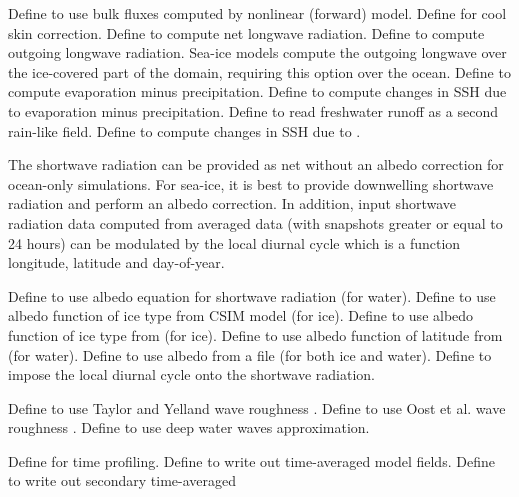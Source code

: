 \begin{klist}
\begin{klist}
     Define to use bulk fluxes computed by
  nonlinear (forward) model.
     Define for cool skin correction.
     Define to compute net longwave radiation.
     Define to compute outgoing longwave radiation.
  Sea-ice models compute the outgoing longwave over the
  ice-covered part of the domain, requiring this option over the ocean.
     Define to compute evaporation minus precipitation.
     Define to compute changes in SSH due to
  evaporation minus precipitation.
     Define to read freshwater runoff as a second
  rain-like field.
     Define to compute changes in SSH due to
  .
  \end{klist}
 The shortwave radiation can be provided as net without an albedo
 correction for ocean-only simulations. For sea-ice, it is best to
 provide downwelling shortwave radiation and perform an albedo
 correction. In addition, input shortwave radiation data computed
 from averaged data (with snapshots greater or equal to 24 hours)
 can be modulated by the local diurnal cycle which is a function
 longitude, latitude and day-of-year.
  \begin{klist}
     Define to use albedo equation for shortwave
  radiation (for water).
     Define to use albedo function of ice type
  from CSIM model (for ice).
     Define to use albedo function of ice type
  from \citet{Ebert93} (for ice).
     Define to use albedo function of latitude
  from \citet{Large_08} (for water).
     Define to use albedo from a file (for both
  ice and water).
     Define to impose the local diurnal cycle
  onto the shortwave radiation.
   \end{klist}
   \mbox{}
  \begin{klist}
     Define to use Taylor and Yelland wave
  roughness \citep{Taylor_2001}.
     Define to use Oost et al. wave
  roughness \citep{Oost_2002}.
     Define to use deep water waves approximation.
  \end{klist}
   \mbox{}
  \begin{klist}
         Define for time profiling.
        Define to write out time-averaged
  model fields.
       Define to write out secondary time-averaged

\end{klist}
\end{klist}

